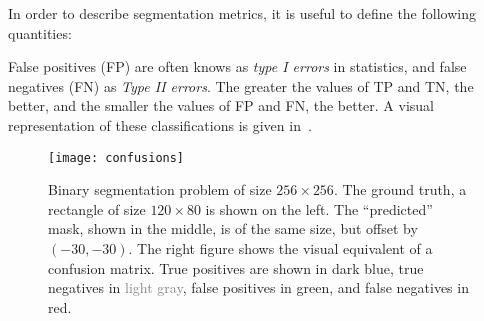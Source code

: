 In order to describe segmentation metrics, it is useful to define the following quantities:

\begin{center}
\end{center}

False positives (FP) are often knows as \textit{type I errors} in statistics, and false negatives (FN) as \textit{Type II errors}.
The greater the values of TP and TN, the better, and the smaller the values of FP and FN, the better.
A visual representation of these classifications is given in~.

\begin{figure}[htb]
  \texttt{[image: confusions]}
  \caption{%
    Binary segmentation problem of size $256 \times 256$.
    The ground truth, a rectangle of size $120 \times 80$ is shown on the left.
    The \enquote{predicted} mask, shown in the middle, is of the same size, but offset by $(-30, -30)$.
    The right figure shows the visual equivalent of a confusion matrix.
    True positives are shown in \textcolor{tp}{dark blue}, true negatives in \textcolor{gray}{light gray}, false positives in \textcolor{fp}{green}, and false negatives in \textcolor{fn}{red}.
  }%
  \label{fig:confusions}
\end{figure}


